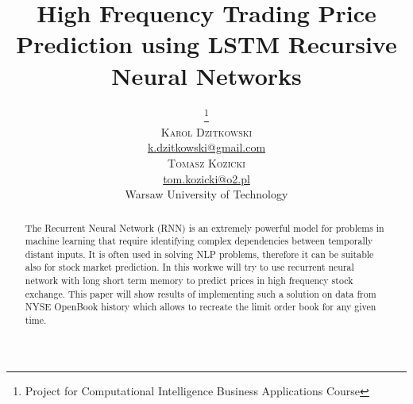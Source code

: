 \documentclass[twoside]{article}
\title{\vspace{-15mm}\fontsize{24pt}{10pt}\selectfont\textbf{High Frequency Trading Price Prediction using LSTM Recursive Neural Networks}} %
\author{
\large
\thanks{Project for Computational Intelligence Business Applications Course}\\[2mm] %
\textsc{Karol Dzitkowski}\\
\normalsize \href{mailto:k.dzitkowski@gmail.com}{k.dzitkowski@gmail.com} \\
\textsc{Tomasz Kozicki}\\
\normalsize \href{mailto:tom.kozicki@o2.pl}{tom.kozicki@o2.pl} \\
\normalsize Warsaw University of Technology\\
\vspace{-5mm}
}
\date{}
\begin{document}
\maketitle %

\thispagestyle{fancy} %


\begin{abstract}

The Recurrent Neural Network (RNN) is an extremely powerful model for problems in machine learning that require identifying complex dependencies between temporally distant inputs. It is often used in solving NLP problems, therefore it can be suitable also for stock market prediction. 
In this workwe will try to use recurrent neural network with long short term memory to predict prices in high frequency stock exchange. This paper will show results of implementing such a solution on data from NYSE OpenBook history which allows to recreate the limit order book for any given time.

\end{abstract}

\end{document}
